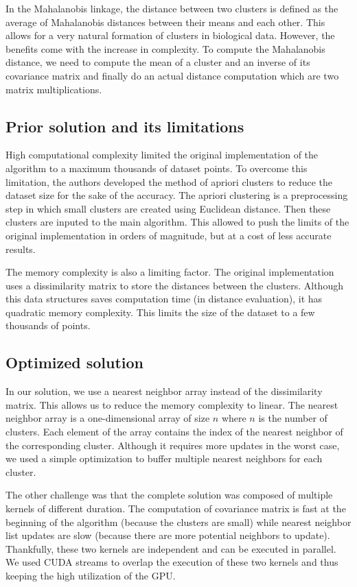 In the Mahalanobis linkage, the distance between two clusters is defined as the average of Mahalanobis distances between their means and each other.
This allows for a very natural formation of clusters in biological data. However, the benefits come with the increase in complexity. 
To compute the Mahalanobis distance, we need to compute the mean of a cluster and an inverse of its covariance matrix and finally do an actual distance computation which are two matrix multiplications.

\subsection{Prior solution and its limitations}

High computational complexity limited the original implementation of the algorithm to a maximum thousands of dataset points. To overcome this limitation, the authors developed the method of apriori clusters to reduce the dataset size for the sake of the accuracy. The apriori clustering is a preprocessing step in which small clusters are created using Euclidean distance. Then these clusters are inputed to the main algorithm. This allowed to push the limits of the original implementation in orders of magnitude, but at a cost of less accurate results.

The memory complexity is also a limiting factor. The original implementation uses a dissimilarity matrix to store the distances between the clusters. Although this data structures saves computation time (in distance evaluation), it has quadratic memory complexity. This limits the size of the dataset to a few thousands of points.

\subsection{Optimized solution}

In our solution, we use a nearest neighbor array instead of the dissimilarity matrix. This allows us to reduce the memory complexity to linear. The nearest neighbor array is a one-dimensional array of size $n$ where $n$ is the number of clusters. Each element of the array contains the index of the nearest neighbor of the corresponding cluster. Although it requires more updates in the worst case, we used a simple optimization to buffer multiple nearest neighbors for each cluster.

The other challenge was that the complete solution was composed of multiple kernels of different duration. The computation of covariance matrix is fast at the beginning of the algorithm (because the clusters are small) while nearest neighbor list updates are slow (because there are more potential neighbors to update). Thankfully, these two kernels are independent and can be executed in parallel. We used CUDA streams to overlap the execution of these two kernels and thus keeping the high utilization of the GPU.

